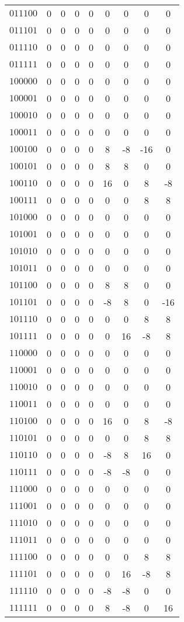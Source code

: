 \documentclass[10pt]{article}
\begin{document}
\begin{center}
\begin{longtable}{c|cccccccc}
$011100$ & 0 & 0 & 0 & 0 & 0 & 0 & 0 & 0 \\
$011101$ & 0 & 0 & 0 & 0 & 0 & 0 & 0 & 0 \\
$011110$ & 0 & 0 & 0 & 0 & 0 & 0 & 0 & 0 \\
$011111$ & 0 & 0 & 0 & 0 & 0 & 0 & 0 & 0 \\
$100000$ & 0 & 0 & 0 & 0 & 0 & 0 & 0 & 0 \\
$100001$ & 0 & 0 & 0 & 0 & 0 & 0 & 0 & 0 \\
$100010$ & 0 & 0 & 0 & 0 & 0 & 0 & 0 & 0 \\
$100011$ & 0 & 0 & 0 & 0 & 0 & 0 & 0 & 0 \\
$100100$ & 0 & 0 & 0 & 0 & 8 & -8 & -16 & 0 \\
$100101$ & 0 & 0 & 0 & 0 & 8 & 8 & 0 & 0 \\
$100110$ & 0 & 0 & 0 & 0 & 16 & 0 & 8 & -8 \\
$100111$ & 0 & 0 & 0 & 0 & 0 & 0 & 8 & 8 \\
$101000$ & 0 & 0 & 0 & 0 & 0 & 0 & 0 & 0 \\
$101001$ & 0 & 0 & 0 & 0 & 0 & 0 & 0 & 0 \\
$101010$ & 0 & 0 & 0 & 0 & 0 & 0 & 0 & 0 \\
$101011$ & 0 & 0 & 0 & 0 & 0 & 0 & 0 & 0 \\
$101100$ & 0 & 0 & 0 & 0 & 8 & 8 & 0 & 0 \\
$101101$ & 0 & 0 & 0 & 0 & -8 & 8 & 0 & -16 \\
$101110$ & 0 & 0 & 0 & 0 & 0 & 0 & 8 & 8 \\
$101111$ & 0 & 0 & 0 & 0 & 0 & 16 & -8 & 8 \\
$110000$ & 0 & 0 & 0 & 0 & 0 & 0 & 0 & 0 \\
$110001$ & 0 & 0 & 0 & 0 & 0 & 0 & 0 & 0 \\
$110010$ & 0 & 0 & 0 & 0 & 0 & 0 & 0 & 0 \\
$110011$ & 0 & 0 & 0 & 0 & 0 & 0 & 0 & 0 \\
$110100$ & 0 & 0 & 0 & 0 & 16 & 0 & 8 & -8 \\
$110101$ & 0 & 0 & 0 & 0 & 0 & 0 & 8 & 8 \\
$110110$ & 0 & 0 & 0 & 0 & -8 & 8 & 16 & 0 \\
$110111$ & 0 & 0 & 0 & 0 & -8 & -8 & 0 & 0 \\
$111000$ & 0 & 0 & 0 & 0 & 0 & 0 & 0 & 0 \\
$111001$ & 0 & 0 & 0 & 0 & 0 & 0 & 0 & 0 \\
$111010$ & 0 & 0 & 0 & 0 & 0 & 0 & 0 & 0 \\
$111011$ & 0 & 0 & 0 & 0 & 0 & 0 & 0 & 0 \\
$111100$ & 0 & 0 & 0 & 0 & 0 & 0 & 8 & 8 \\
$111101$ & 0 & 0 & 0 & 0 & 0 & 16 & -8 & 8 \\
$111110$ & 0 & 0 & 0 & 0 & -8 & -8 & 0 & 0 \\
$111111$ & 0 & 0 & 0 & 0 & 8 & -8 & 0 & 16 \\
\end{longtable}
\end{center}
\end{document}
